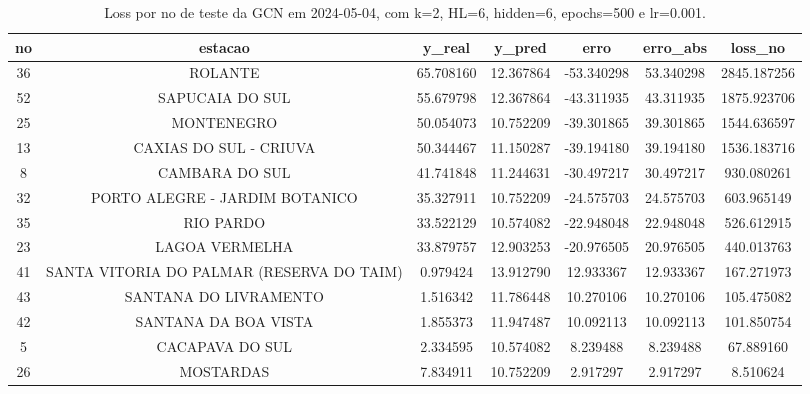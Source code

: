 \begin{table}[h]
\centering
\caption{Loss por no de teste da GCN em 2024-05-04, com k=2, HL=6, hidden=6, epochs=500 e lr=0.001.}
\label{tab:gcn_loss_k2_hl6_h6_e500_d20240504}
\begin{tabular}{ccccccc}
\toprule
no & estacao & y\_real & y\_pred & erro & erro\_abs & loss\_no \\
\midrule
36 & ROLANTE & 65.708160 & 12.367864 & -53.340298 & 53.340298 & 2845.187256 \\
52 & SAPUCAIA DO SUL & 55.679798 & 12.367864 & -43.311935 & 43.311935 & 1875.923706 \\
25 & MONTENEGRO & 50.054073 & 10.752209 & -39.301865 & 39.301865 & 1544.636597 \\
13 & CAXIAS DO SUL - CRIUVA & 50.344467 & 11.150287 & -39.194180 & 39.194180 & 1536.183716 \\
8 & CAMBARA DO SUL & 41.741848 & 11.244631 & -30.497217 & 30.497217 & 930.080261 \\
32 & PORTO ALEGRE - JARDIM BOTANICO & 35.327911 & 10.752209 & -24.575703 & 24.575703 & 603.965149 \\
35 & RIO PARDO & 33.522129 & 10.574082 & -22.948048 & 22.948048 & 526.612915 \\
23 & LAGOA VERMELHA & 33.879757 & 12.903253 & -20.976505 & 20.976505 & 440.013763 \\
41 & SANTA VITORIA DO PALMAR (RESERVA DO TAIM) & 0.979424 & 13.912790 & 12.933367 & 12.933367 & 167.271973 \\
43 & SANTANA DO LIVRAMENTO & 1.516342 & 11.786448 & 10.270106 & 10.270106 & 105.475082 \\
42 & SANTANA DA BOA VISTA & 1.855373 & 11.947487 & 10.092113 & 10.092113 & 101.850754 \\
5 & CACAPAVA DO SUL & 2.334595 & 10.574082 & 8.239488 & 8.239488 & 67.889160 \\
26 & MOSTARDAS & 7.834911 & 10.752209 & 2.917297 & 2.917297 & 8.510624 \\
\bottomrule
\end{tabular}
\end{table}
